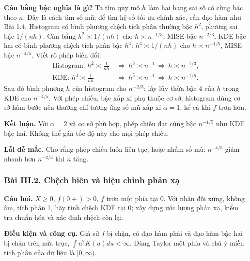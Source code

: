 \textbf{Cân bằng bậc nghĩa là gì?} Ta tìm quy mô $h$ làm hai hạng sai số
có cùng bậc theo $n$. Đây là cách tìm số mũ; để tìm hệ số tối ưu chính xác,
cần đạo hàm như Bài 1.4.
Histogram có bình phương chệch tích phân thường bậc $h^2$, phương sai bậc $1/(nh)$.
Cân bằng $h^2\asymp1/(nh)$ cho $h\asymp n^{-1/3}$, MISE bậc $n^{-2/3}$.
KDE bậc hai có bình phương chệch tích phân bậc $h^4$:
$h^4\asymp1/(nh)$ cho $h\asymp n^{-1/5}$, MISE bậc $n^{-4/5}$.
Viết rõ phép biến đổi:
\begin{align*}
\text{Histogram: }h^2\asymp\frac1{nh}
&\ \Longrightarrow\ h^3\asymp n^{-1}
\ \Longrightarrow\ h\asymp n^{-1/3},\\
\text{KDE: }h^4\asymp\frac1{nh}
&\ \Longrightarrow\ h^5\asymp n^{-1}
\ \Longrightarrow\ h\asymp n^{-1/5}.
\end{align*}
Sau đó bình phương $h$ của histogram cho $n^{-2/3}$;
lấy lũy thừa bậc 4 của $h$ trong KDE cho $n^{-4/5}$.
Với phép chiếu, bậc xấp xỉ phụ thuộc cơ sở; histogram dùng cơ sở hàm bước nên thường
chỉ tương ứng số mũ xấp xỉ $\alpha=1$, kể cả khi $f$ trơn hơn.

\textbf{Kết luận.} Với $\alpha=2$ và cơ sở phù hợp, phép chiếu đạt cùng bậc $n^{-4/5}$
như KDE bậc hai. Không thể gán tốc độ này cho mọi phép chiếu.

\textbf{Lỗi dễ mắc.} Cho rằng phép chiếu luôn liên tục;
hoặc nhầm số mũ: $n^{-4/5}$ giảm nhanh hơn $n^{-2/3}$ khi $n$ tăng.

\subsubsection*{Bài III.2. Chệch biên và hiệu chỉnh phản xạ}\label{ot45:boundary}
\textbf{Câu hỏi.} $X\geq0$, $f(0+)>0$, $f$ trơn một phía tại 0.
Với nhân đối xứng, không âm, tích phân 1, hãy tính chệch KDE tại 0;
xây dựng ước lượng phản xạ, kiểm tra chuẩn hóa và xác định chệch còn lại.

\textbf{Điều kiện và công cụ.} Giả sử $f$ bị chặn, có đạo hàm phải và đạo hàm bậc hai
bị chặn trên nửa trục, $\int u^2K(u)du<\infty$.
Dùng Taylor một phía và chú ý miền tích phân của dữ liệu là $[0,\infty)$.

